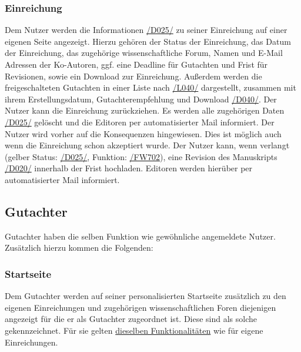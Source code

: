 \subsubsection{Einreichung}\label{nut:ein}
\begin{description}
     Dem Nutzer werden die Informationen \hyperref[d025]{/D025/} zu seiner Einreichung auf einer eigenen Seite
    angezeigt. Hierzu gehören der Status der Einreichung, das Datum der Einreichung, das zugehörige
    wissenschaftliche Forum, Namen und E-Mail Adressen der Ko-Autoren, ggf. eine Deadline für Gutachten und Frist für Revisionen,
    sowie ein Download zur Einreichung.
     Außerdem werden die freigeschalteten Gutachten in einer
    Liste nach \hyperref[leist:40]{/L040/} dargestellt, zusammen mit ihrem Erstellungsdatum, Gutachterempfehlung und Download \hyperref[d040]{/D040/}.
     Der Nutzer kann die Einreichung zurückziehen. Es werden alle zugehörigen Daten
    \hyperref[d025]{/D025/} gelöscht und die Editoren per automatisierter Mail informiert.
    Der Nutzer wird vorher auf die Konsequenzen hingewiesen. Dies ist möglich auch wenn die Einreichung schon akzeptiert wurde.
     Der Nutzer kann, wenn verlangt (gelber Status: \hyperref[d025]{/D025/}, Funktion: \hyperref[funkt:702]{/FW702}),
    eine Revision des Manuskripts \hyperref[d020]{/D020/} innerhalb der Frist hochladen.
    Editoren werden hierüber per automatisierter Mail informiert.
\end{description}

\subsection{Gutachter}\label{funkt:Gutachter}
Gutachter haben die selben Funktion wie gewöhnliche angemeldete Nutzer. Zusätzlich hierzu kommen die Folgenden:

\subsubsection{Startseite}
\begin{description}
     Dem Gutachter werden auf seiner personalisierten Startseite zusätzlich zu den eigenen
    Einreichungen und zugehörigen wissenschaftlichen Foren diejenigen angezeigt für die er als Gutachter
    zugeordnet ist. Diese sind als solche gekennzeichnet.
    Für sie gelten \hyperref[nut:start]{dieselben Funktionalitäten} wie für eigene Einreichungen.
\end{description}

